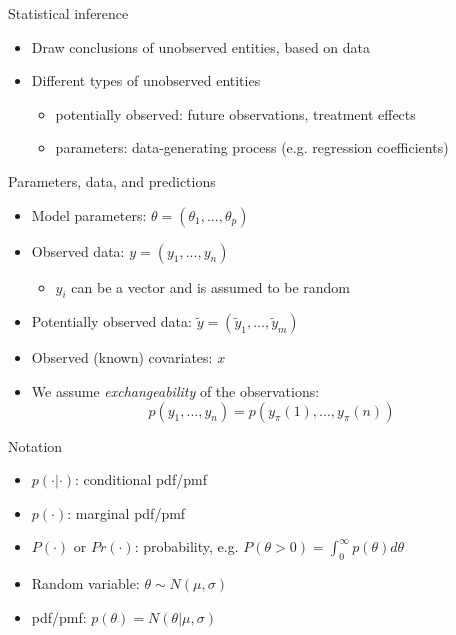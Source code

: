 \documentclass[10pt]{beamer}
\begin{document}
\begin{frame}{Statistical inference}
  \begin{itemize}
  \item Draw conclusions of {\color{uured} unobserved} entities, based on {\color{uured} data} \pause
  \item Different types of unobserved entities
    \begin{itemize}
    \item {\color{uured} potentially observed}: future observations, treatment effects
    \item {\color{uured} parameters}: data-generating process (e.g. regression coefficients)
    \end{itemize}
  \end{itemize}
\end{frame}

\begin{frame}{Parameters, data, and predictions}

  \begin{itemize}
  \item Model parameters: $\theta = (\theta_1,...,\theta_p)$
  \item Observed data: $y = (y_1,...,y_n)$
    \begin{itemize}
    \item $y_i$ can be a vector and is assumed to be random
    \end{itemize}
  \item Potentially observed data: $\tilde{y} = (\tilde{y}_1,...,\tilde{y}_m)$
  \item Observed (known) covariates: $x$
  \item We assume \emph{exchangeability} of the observations:
\[
p(y_1,...,y_n) = p(y_\pi(1),...,y_\pi(n))
\]
  \end{itemize}
\end{frame}

\begin{frame}{Notation}

  \begin{itemize}
    \item $p(\cdot|\cdot)$: conditional pdf/pmf
    \item $p(\cdot)$: marginal pdf/pmf
    \item $P(\cdot)$ or $Pr(\cdot)$: probability, e.g. $P(\theta > 0) = \int_0^\infty p(\theta) d\theta$
    \item Random variable: $\theta \sim N(\mu,\sigma)$
    \item pdf/pmf: $p(\theta) = N(\theta | \mu,\sigma)$
  \end{itemize}

\end{frame}
\end{document}

